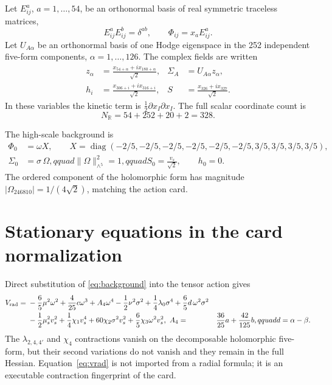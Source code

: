 \documentclass[11pt]{article}
\begin{document}
Let $E^a_{ij}$, $a=1,\ldots,54$, be an orthonormal basis of real symmetric
traceless matrices,
\begin{equation}
 E^a_{ij}E^b_{ij}=\delta^{ab},\qquad \Phi_{ij}=x_aE^a_{ij}.
\end{equation}
Let $U_{A\alpha}$ be an orthonormal basis of one Hodge eigenspace in the 252
independent five-form components, $\alpha=1,\ldots,126$.  The complex fields
are written
\begin{align}
 z_\alpha&=\frac{x_{54+\alpha}+i x_{180+\alpha}}{\sqrt2},
 &\Sigma_A&=U_{A\alpha}z_\alpha,\nonumber\\
 h_i&=\frac{x_{306+i}+i x_{316+i}}{\sqrt2},
 &S&=\frac{x_{326}+ix_{327}}{\sqrt2}.
\end{align}
In these variables the kinetic term is $\frac12\partial x_I\partial x_I$.
The full scalar coordinate count is
\begin{equation}
 \boxed{N_{\mathbb R}=54+252+20+2=328.}
\end{equation}

The high-scale background is
\begin{align}
 \Phi_0&=\omega X,\qquad
 X=\operatorname{diag}(-2/5,-2/5,-2/5,-2/5,-2/5,-2/5,
 3/5,3/5,3/5,3/5),\nonumber\\
 \Sigma_0&=\sigma\,\Omega,qquad
 \|\Omega\|^2_{\wedge^5}=1,qquad
 S_0=\frac{v_s}{\sqrt2},\qquad h_0=0.
 \label{eq:background}
\end{align}
The ordered component of the holomorphic form has magnitude
$|\Omega_{246810}|=1/(4\sqrt2)$, matching the action card.

\section{Stationary equations in the card normalization}

Direct substitution of \eqref{eq:background} into the tensor action gives
\begin{align}
V_{\rm rad}={}&-\frac65\mu^2\omega^2+\frac4{25}c\omega^3
+A_4\omega^4-\frac12\nu^2\sigma^2+\frac14\lambda_0\sigma^4
+\frac65d\,\omega^2\sigma^2\nonumber\\
&-\frac12\mu_s^2v_s^2+\frac14\chi_1v_s^4
+60\chi_2\sigma^2v_s^2+\frac65\chi_3\omega^2v_s^2,
\label{eq:vrad}\
A_4={}&\frac{36}{25}a+\frac{42}{125}b,qquad d=\alpha-\beta.
\end{align}
The $\lambda_{2,4,4'}$ and $\chi_4$ contractions vanish on the decomposable
holomorphic five-form, but their second variations do not vanish and they
remain in the full Hessian.  Equation~\eqref{eq:vrad} is not imported from a
radial formula; it is an executable contraction fingerprint of the card.
\end{document}
